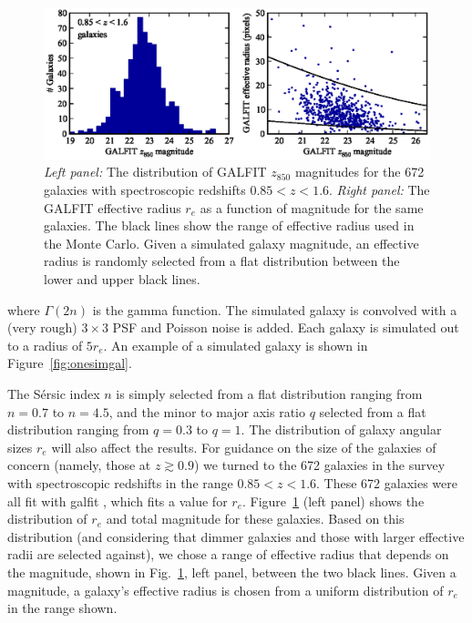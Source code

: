 \begin{figure}[hp]
\begin{center}
\includegraphics{figures/clrate/specgals.eps}
\end{center}
\caption[Effective radii of spectroscopically-confirmed galaxies]{{\it
    Left panel:} The distribution of GALFIT $z_{850}$ magnitudes for
  the 672 galaxies with spectroscopic redshifts $0.85 < z < 1.6$.
  {\it Right panel:} The GALFIT effective radius $r_e$ as a function
  of magnitude for the same galaxies. The black lines show the range
  of effective radius used in the Monte Carlo. Given a simulated
  galaxy magnitude, an effective radius is randomly selected from a
  flat distribution between the lower and upper black lines.
  \label{fig:specgals}}
\end{figure}

\noindent where $\Gamma(2n)$ is the gamma function. The
simulated galaxy is convolved with a (very rough) $3 \times 3$ PSF and
Poisson noise is added.  Each galaxy is simulated out to a radius of $5r_e$. 
An example of a simulated galaxy is shown in Figure~\ref{fig:onesimgal}.

The S{\'e}rsic index $n$ is simply selected from a flat distribution
ranging from $n = 0.7$ to $n = 4.5$, and the minor to major axis ratio
$q$ selected from a flat distribution ranging from $q = 0.3$ to $q =
1$.  The distribution of galaxy angular sizes $r_e$ will also affect the
results. For guidance on the size of the galaxies of concern (namely,
those at $z \gtrsim 0.9$) we turned to the 672 galaxies in the survey
with spectroscopic redshifts in the range $0.85<z<1.6$. These 672
galaxies were all fit with {\sc galfit} \citep{peng02a}, which fits a
value for $r_e$.  Figure~\ref{fig:specgals} (left panel) shows the
distribution of $r_e$ and total magnitude for these galaxies. Based on
this distribution (and considering that dimmer galaxies and those with
larger effective radii are selected against), we chose a range of
effective radius that depends on the magnitude, shown in
Fig.~\ref{fig:specgals}, left panel, between the two black
lines. Given a magnitude, a galaxy's effective radius is chosen from a
uniform distribution of $r_e$ in the range shown.

